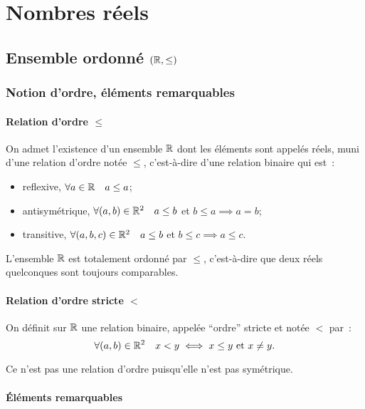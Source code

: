 \chapter{Nombres réels}
\label{chap:reels}
\minitoc
\minilof
\minilot
\section{Ensemble ordonné $(\mathbb{R},\leq)$}

\subsection{Notion d'ordre, éléments remarquables}

\subsubsection{Relation d'ordre $\leq$}

On admet l'existence d'un ensemble $\mathbb{R}$ dont les éléments sont appelés réels, muni d'une relation d'ordre notée $\leq$, c'est-à-dire d'une relation binaire qui est~:
\begin{itemize}
\item reflexive, $\forall a \in \mathbb{R} \quad a\leq a$;
\item antisymétrique, $\forall (a,b) \in \mathbb{R}^2 \quad a\leq b$ et $ b\leq a \implies a=b$;
\item transitive, $\forall (a,b,c) \in \mathbb{R}^2 \quad a\leq b$ et $b\leq c \implies a\leq c$.
\end{itemize}
L'ensemble $\mathbb{R}$ est totalement ordonné par $\leq$, c'est-à-dire que deux réels quelconques sont toujours comparables.

\subsubsection{Relation d'ordre stricte $<$}

\begin{defdef}
  On définit sur $\mathbb{R}$ une relation binaire, appelée ``ordre'' stricte et notée $<$ par~:
  \begin{equation}
    \forall (a,b) \in \mathbb{R}^2 \quad x<y \iff x\leq y \text{~et~} x\neq y.
  \end{equation}
\end{defdef}
Ce n'est pas une relation d'ordre puisqu'elle n'est pas symétrique.

\subsubsection{Éléments remarquables}

